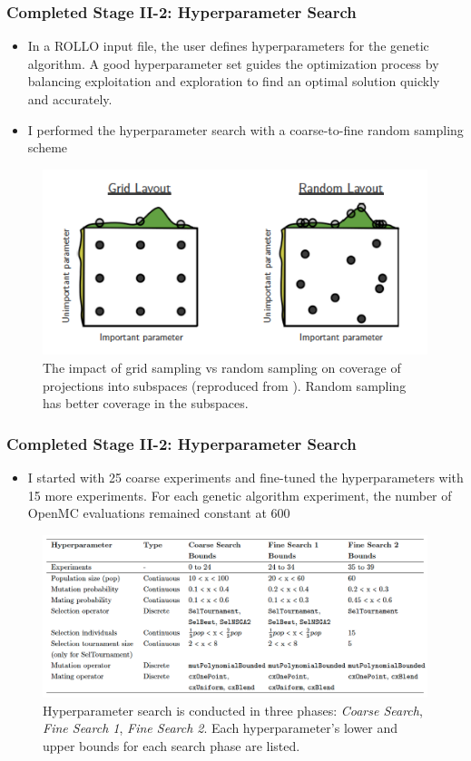 \begin{frame}
    \frametitle{Completed Stage II-2: Hyperparameter Search}
    \begin{itemize}
        \item In a ROLLO input file, the user defines hyperparameters for the genetic 
        algorithm. A good hyperparameter set guides the optimization process by 
        balancing exploitation and exploration to find an optimal solution quickly 
        and accurately. 
        \item I performed the hyperparameter search with a coarse-to-fine random sampling scheme
    \end{itemize}
    \begin{figure}[]
        \centering
        \includegraphics[width=0.5\linewidth]{../docs/figures/random_vs_grid_sampling.png} 
        \caption{The impact of grid sampling vs random sampling on coverage of projections 
        into subspaces (reproduced from \cite{jordan_hyperparameter_2017}). 
        Random sampling has better coverage in the subspaces.}
    \end{figure}
\end{frame}

\begin{frame}
    \frametitle{Completed Stage II-2: Hyperparameter Search}
    \begin{itemize}
        \item I started with 25 coarse experiments and fine-tuned the hyperparameters
        with 15 more experiments. For each genetic algorithm experiment, the number 
        of OpenMC evaluations remained constant at 600
    \end{itemize}
    \begin{figure}
        \caption{Hyperparameter search is conducted in three phases: \textit{Coarse Search}, 
    \textit{Fine Search 1}, \textit{Fine Search 2}. Each hyperparameter's lower and
    upper bounds for each search phase are listed.}
        \includegraphics[width=0.8\linewidth]{figures/hyperparameter-search.png} 
    \end{figure}
\end{frame}

